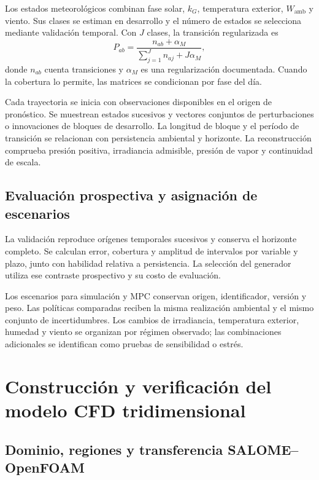 Los estados meteorológicos combinan fase solar, $k_G$, temperatura exterior, $W_{\mathrm{amb}}$ y viento. Sus clases se estiman en desarrollo y el número de estados se selecciona mediante validación temporal. Con $J$ clases, la transición regularizada es
\begin{equation}
\widehat P_{ab}=\frac{n_{ab}+\alpha_M}{\sum_{j=1}^{J}n_{aj}+J\alpha_M},
\label{met:transicion_markov}
\end{equation}
donde $n_{ab}$ cuenta transiciones y $\alpha_M$ es una regularización documentada. Cuando la cobertura lo permite, las matrices se condicionan por fase del día.

Cada trayectoria se inicia con observaciones disponibles en el origen de pronóstico. Se muestrean estados sucesivos y vectores conjuntos de perturbaciones o innovaciones de bloques de desarrollo. La longitud de bloque y el período de transición se relacionan con persistencia ambiental y horizonte. La reconstrucción comprueba presión positiva, irradiancia admisible, presión de vapor y continuidad de escala.

\subsection{Evaluación prospectiva y asignación de escenarios}

La validación reproduce orígenes temporales sucesivos y conserva el horizonte completo. Se calculan error, cobertura y amplitud de intervalos por variable y plazo, junto con habilidad relativa a persistencia. La selección del generador utiliza ese contraste prospectivo y su costo de evaluación.

Los escenarios para simulación y MPC conservan origen, identificador, versión y peso. Las políticas comparadas reciben la misma realización ambiental y el mismo conjunto de incertidumbres. Los cambios de irradiancia, temperatura exterior, humedad y viento se organizan por régimen observado; las combinaciones adicionales se identifican como pruebas de sensibilidad o estrés.

\section{Construcción y verificación del modelo CFD tridimensional}
\label{met:cfd}

\subsection{Dominio, regiones y transferencia SALOME--OpenFOAM}


